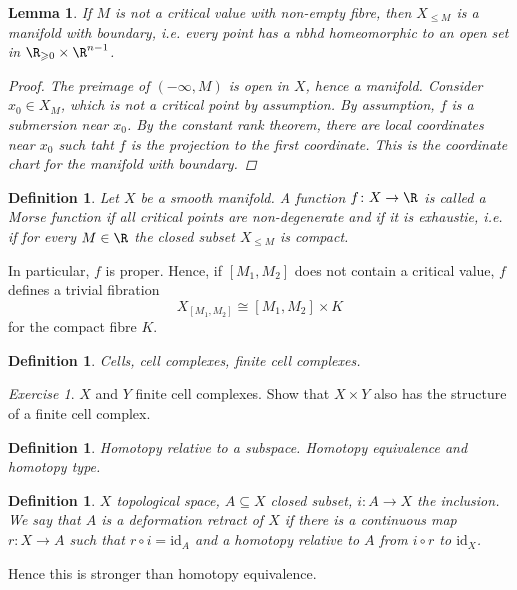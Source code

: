 \documentclass[A4paper, british]{amsart}
\theoremstyle{darkgreentheorem}
\newtheorem{lm}[thm]{Lemma}
\theoremstyle{darkbluedefinition}
\newtheorem{defn}[thm]{Definition}
\theoremstyle{darkredexample}
\theoremstyle{remark}
\newtheorem{exe}[thm]{Exercise}
\newcommand{\1}{\mathbbm{1}}
\newcommand{\id}{\mathrm{id}}
\newcommand{\sub}{\subseteq}
\begin{document}
\begin{lm}
    If $M$ is not a critical value with non-empty fibre, then $X_{\leqslant M}$ is a manifold with boundary, i.e. every point has a nbhd homeomorphic to an open set in $\R_{\geqslant 0}\times \R^{n-1}$.
    \begin{proof}
	The preimage of $(-\infty,M)$ is open in $X$, hence a manifold.
	Consider $x_{0}\in X_{M}$, which is not a critical point by assumption.
	By assumption, $f$ is a submersion near $x_{0}$.
	By the constant rank theorem, there are local coordinates near $x_{0}$ such taht $f$ is the projection to the first coordinate.
	This is the coordinate chart for the manifold with boundary.
    \end{proof}
\end{lm}

\begin{defn}
    Let $X$ be a smooth manifold.
    A function $f\colon X\to \R$ is called a \textit{Morse function} if all critical points are non-degenerate and if it is exhaustie, i.e. if for every $M\in \R$ the closed subset $X_{\leqslant M}$ is compact.
\end{defn}

In particular, $f$ is proper.
Hence, if $[M_{1},M_{2}]$ does not contain a critical value, $f$ defines a trivial fibration
\[ X_{[M_{1},M_{2}]}\cong [M_{1},M_{2}]\times K \]
for the compact fibre $K$.

\begin{defn}
    Cells, cell complexes, finite cell complexes.
\end{defn}

\begin{exe}
    $X$ and $Y$ finite cell complexes.
    Show that $X\times Y$ also has the structure of a finite cell complex.
\end{exe}

\begin{defn}
    Homotopy relative to a subspace.
    Homotopy equivalence and homotopy type.
\end{defn}

\begin{defn}
    $X$ topological space, $A\sub X$ closed subset, $i\colon A\to X$ the inclusion.
    We say that $A$ is a \textit{deformation retract} of $X$ if there is a continuous map $r\colon X\to A$ such that $r\circ i=\id_{A}$ and a homotopy relative to $A$ from $i\circ r$ to $\id_{X}$.
\end{defn}

Hence this is stronger than homotopy equivalence.
\end{document}
